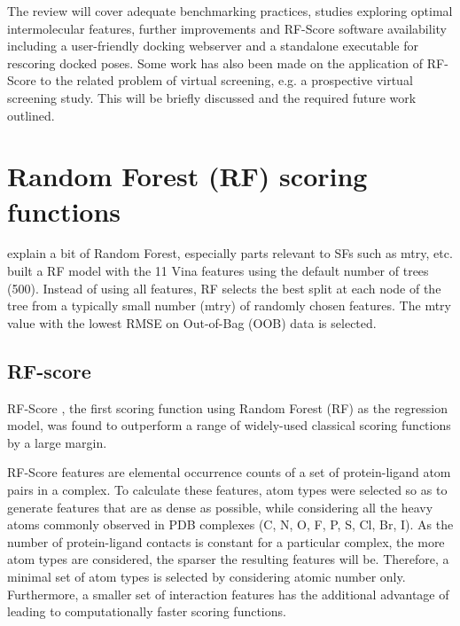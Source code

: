 \documentclass{llncs}
\begin{document}
The review will cover adequate benchmarking practices, studies exploring optimal intermolecular features, further improvements and RF-Score software availability including a user-friendly docking webserver and a standalone executable for rescoring docked poses. Some work has also been made on the application of RF-Score to the related problem of virtual screening, e.g. a prospective virtual screening study. This will be briefly discussed and the required future work outlined. %

\section{Random Forest (RF) scoring functions}

explain a bit of Random Forest, especially parts relevant to SFs such as mtry, etc. built a RF model with the 11 Vina features using the default number of trees (500). Instead of using all features, RF selects the best split at each node of the tree from a typically small number (mtry) of randomly chosen features. The mtry value with the lowest RMSE on Out-of-Bag (OOB) data is selected. %

\subsection{RF-score}

RF-Score \cite{564}, the first scoring function using Random Forest (RF) \cite{1309} as the regression model, was found to outperform a range of widely-used classical scoring functions by a large margin.

RF-Score features are elemental occurrence counts of a set of protein-ligand atom pairs in a complex. To calculate these features, atom types were selected so as to generate features that are as dense as possible, while considering all the heavy atoms commonly observed in PDB complexes (C, N, O, F, P, S, Cl, Br, I). As the number of protein-ligand contacts is constant for a particular complex, the more atom types are considered, the sparser the resulting features will be. Therefore, a minimal set of atom types is selected by considering atomic number only. Furthermore, a smaller set of interaction features has the additional advantage of leading to computationally faster scoring functions.
\end{document}
